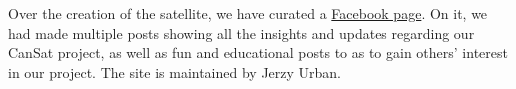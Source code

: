 \documentclass[class=report, crop=false]{standalone}
\begin{document}
Over the creation of the satellite, we have curated a \href{https://www.facebook.com/The-Can-Openers-105096144746388}{Facebook page}.
On it, we had made multiple posts showing all the insights and updates regarding our CanSat project, as well as fun and educational posts to as to gain others' interest in our project.
The site is maintained by Jerzy Urban.
\end{document}
